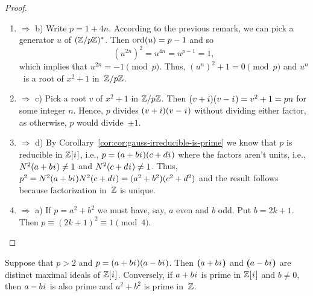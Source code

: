 \begin{proof}${}$
    \begin{enumerate}[\rm a)]
        \item $\Rightarrow$ b) Write $p=1+4n$. According to the previous remark, we can pick a generator $u$ of $(\mathbb{Z}/p\mathbb{Z})^*$. Then ${\rm ord}(u)=p-1$ and so
        $$
            (u^{2n})^2=u^{4n} = u^{p-1}=1,
        $$
        which implies that $u^{2n}=-1\pmod p$. Thus, $(u^n)^2+1 = 0\pmod p$ and $u^n$~is a root of $x^2+1$ in~$\mathbb{Z}/p\mathbb{Z}$.

        \item $\Rightarrow$ c) Pick a root $v$ of $x^2 + 1$ in $\mathbb{Z}/p\mathbb{Z}$. Then $(v+i)(v-{\mkern1mu i\mkern1mu}) = v^2 + 1 = pn$ for some integer $n$. Hence, $p$ divides $(v+i)(v-{\mkern1mu i\mkern1mu})$ without dividing either factor, as otherwise, $p$ would divide~$\pm 1$.

        \item $\Rightarrow$ d) By Corollary~\ref{cor:cor:gauss-irreducible-is-prime} we know that $p$ is reducible in $\mathbb{Z}[{\mkern1mu i\mkern1mu}]$, i.e., $p=(a+b{\mkern1mu i\mkern1mu})(c+d{\mkern1mu i\mkern1mu})$ where the factors aren't units, i.e., $N^2(a+b{\mkern1mu i\mkern1mu})\ne1$ and $N^2(c+d{\mkern1mu i\mkern1mu})\ne1$. Thus, $p^2=N^2(a+b{\mkern1mu i\mkern1mu})N^2(c+d{\mkern1mu i\mkern1mu})=(a^2+b^2)(c^2+d^2)$ and the result follows because factorization in~$\mathbb{Z}$ is unique.

        \item $\Rightarrow$ a) If $p=a^2+b^2$ we must have, say, $a$ even and $b$ odd. Put $b=2k+1$. Then $p\equiv(2k+1)^2\equiv1\pmod4$.

    \end{enumerate}
\end{proof}

\begin{thm}
    Suppose that\/ $p > 2$ and\/ $p = (a+b{\mkern1mu i\mkern1mu})(a-b{\mkern1mu i\mkern1mu})$. Then\/ $\textrm{\boldmath$($}a+b{\mkern1mu i\mkern1mu}\textrm{\boldmath$)$}$ and\/ $\textrm{\boldmath$($}a-b{\mkern1mu i\mkern1mu}\textrm{\boldmath$)$}$ are distinct maximal ideals of\/ $\mathbb{Z}[{\mkern1mu i\mkern1mu}]$. Conversely, if $a+b{\mkern1mu i\mkern1mu}$ is prime in $\mathbb{Z}[{\mkern1mu i\mkern1mu}]$ and $b\ne0$, then $a-b{\mkern1mu i\mkern1mu}$ is also prime and $a^2+b^2$ is prime in~$\mathbb{Z}$.
\end{thm}

